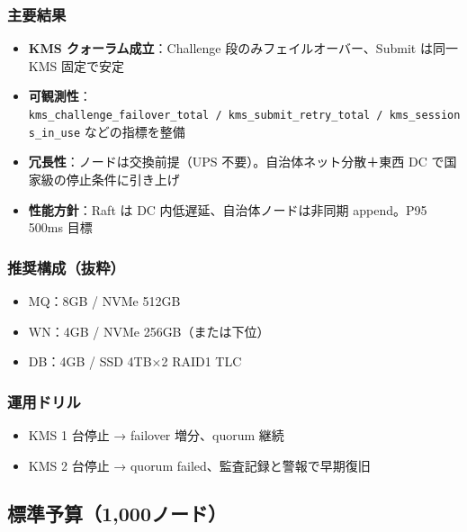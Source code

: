 \documentclass[
]{article}
\providecommand{\tightlist}{%
  \setlength{\itemsep}{0pt}\setlength{\parskip}{0pt}}
\begin{document}
\subsubsection{主要結果}\label{ux4e3bux8981ux7d50ux679c}

\begin{itemize}
\tightlist
\item
  \textbf{KMS クォーラム成立}：Challenge 段のみフェイルオーバー、Submit
  は同一 KMS 固定で安定\\
\item
  \textbf{可観測性}：\texttt{kms\_challenge\_failover\_total\ /\ kms\_submit\_retry\_total\ /\ kms\_sessions\_in\_use}
  などの指標を整備\\
\item
  \textbf{冗長性}：ノードは交換前提（UPS 不要）。自治体ネット分散＋東西
  DC で国家級の停止条件に引き上げ\\
\item
  \textbf{性能方針}：Raft は DC 内低遅延、自治体ノードは非同期
  append。P95 500ms 目標
\end{itemize}

\subsubsection{推奨構成（抜粋）}\label{ux63a8ux5968ux69cbux6210ux629cux7c8b}

\begin{itemize}
\tightlist
\item
  MQ：8GB / NVMe 512GB\\
\item
  WN：4GB / NVMe 256GB（または下位）\\
\item
  DB：4GB / SSD 4TB×2 RAID1 TLC
\end{itemize}

\subsubsection{運用ドリル}\label{ux904bux7528ux30c9ux30eaux30eb}

\begin{itemize}
\tightlist
\item
  KMS 1 台停止 → failover 増分、quorum 継続\\
\item
  KMS 2 台停止 → quorum failed、監査記録と警報で早期復旧
\end{itemize}

\subsection{標準予算（1,000ノード）}\label{ux6a19ux6e96ux4e88ux7b971000ux30ceux30fcux30c9}
\end{document}
